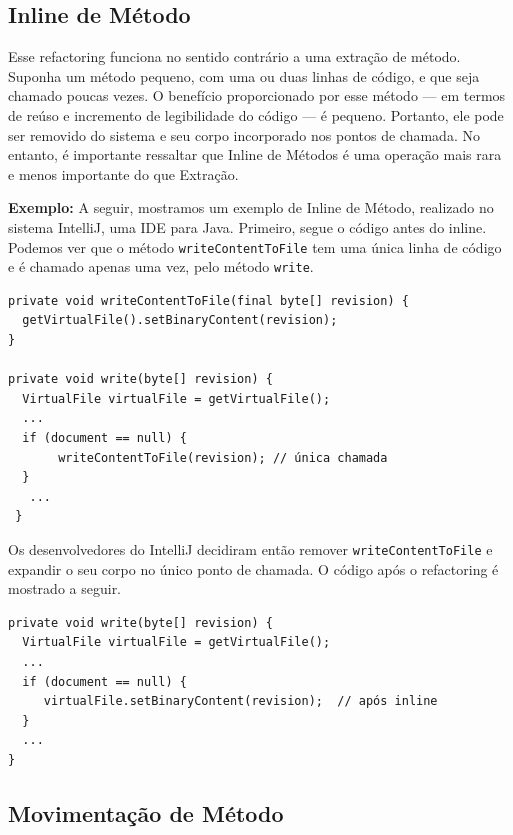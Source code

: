 \documentclass[
  11pt,
  twoside]{book}
\newcommand{\passthrough}[1]{#1}
\begin{document}
\hypertarget{inline-de-muxe9todo}{%
\subsection{Inline de Método}\label{inline-de-muxe9todo}}


Esse refactoring funciona no sentido contrário a uma extração de método.
Suponha um método pequeno, com uma ou duas linhas de código, e que seja
chamado poucas vezes. O benefício proporcionado por esse método --- em
termos de reúso e incremento de legibilidade do código --- é pequeno.
Portanto, ele pode ser removido do sistema e seu corpo incorporado nos
pontos de chamada. No entanto, é importante ressaltar que Inline de
Métodos é uma operação mais rara e menos importante do que Extração.

\textbf{Exemplo:} A seguir, mostramos um exemplo de Inline de Método,
realizado no sistema IntelliJ, uma IDE para Java. Primeiro, segue o
código antes do inline. Podemos ver que o método
\passthrough{\lstinline!writeContentToFile!} tem uma única linha de
código e é chamado apenas uma vez, pelo método
\passthrough{\lstinline!write!}.

\begin{lstlisting}
private void writeContentToFile(final byte[] revision) {
  getVirtualFile().setBinaryContent(revision);
}
 
private void write(byte[] revision) {
  VirtualFile virtualFile = getVirtualFile();
  ...
  if (document == null) {
       writeContentToFile(revision); // única chamada      
  }
   ...
 }
\end{lstlisting}

Os desenvolvedores do IntelliJ decidiram então remover
\passthrough{\lstinline!writeContentToFile!} e expandir o seu corpo no
único ponto de chamada. O código após o refactoring é mostrado a seguir.

\begin{lstlisting}
private void write(byte[] revision) {
  VirtualFile virtualFile = getVirtualFile();
  ...
  if (document == null) {
     virtualFile.setBinaryContent(revision);  // após inline
  }
  ...
}
\end{lstlisting}

\hypertarget{movimentauxe7uxe3o-de-muxe9todo}{%
\subsection{Movimentação de
Método}\label{movimentauxe7uxe3o-de-muxe9todo}}
\end{document}
